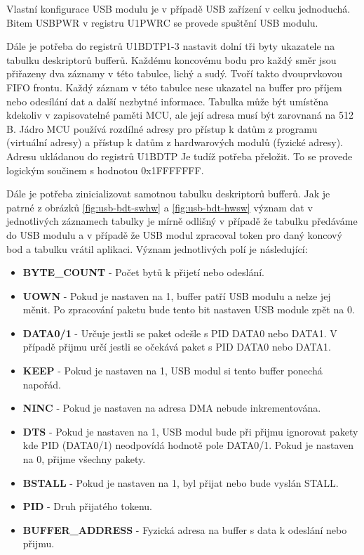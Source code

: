 Vlastní konfigurace USB modulu je v případě USB zařízení v celku jednoduchá. Bitem USBPWR v registru U1PWRC se provede spuštění USB modulu. 

Dále je potřeba do registrů U1BDTP1-3 nastavit dolní tři byty ukazatele na tabulku deskriptorů bufferů. Každému koncovému bodu pro každý směr jsou přiřazeny dva záznamy v této tabulce, lichý a sudý. Tvoří takto dvouprvkovou FIFO frontu.  Každý záznam v této tabulce nese ukazatel na buffer pro příjem nebo odesílání dat a další nezbytné informace. Tabulka může být umístěna kdekoliv v zapisovatelné paměti MCU, ale její adresa musí být zarovnaná na 512 B. Jádro MCU používá rozdílné adresy pro přístup k datům z programu (virtuální adresy) a přístup k datům z hardwarových modulů (fyzické adresy). Adresu ukládanou do registrů U1BDTP Je tudíž potřeba přeložit. To se provede logickým součinem s hodnotou 0x1FFFFFFF.



Dále je potřeba zinicializovat samotnou tabulku deskriptorů bufferů. Jak je patrné z obrázků \ref{fig:usb-bdt-swhw} a \ref{fig:usb-bdt-hwsw} význam dat v jednotlivých záznamech tabulky je mírně odlišný v případě že tabulku předáváme do USB modulu a v případě že USB modul zpracoval token pro daný koncový bod a tabulku vrátil aplikaci. Význam jednotlivých polí je následující:
\begin{itemize}
\item \textbf{BYTE\_COUNT} - Počet bytů k přijetí nebo odeslání.
\item \textbf{UOWN} - Pokud je nastaven na 1, buffer patří USB modulu a nelze jej měnit. Po zpracování paketu bude tento bit nastaven USB module zpět na 0.
\item \textbf{DATA0/1} - Určuje jestli se paket odešle s PID DATA0 nebo DATA1. V případě přijmu určí jestli se očekává paket s PID DATA0 nebo DATA1.
\item \textbf{KEEP} - Pokud je nastaven na 1, USB modul si tento buffer ponechá napořád.
\item \textbf{NINC} - Pokud je nastaven na adresa DMA nebude inkrementována.
\item \textbf{DTS} - Pokud je nastaven na 1, USB modul bude při přijmu ignorovat pakety kde PID (DATA0/1) neodpovídá hodnotě pole DATA0/1. Pokud je nastaven na 0, přijme všechny pakety.
\item \textbf{BSTALL} - Pokud je nastaven na 1, byl přijat nebo bude vyslán STALL. 
\item \textbf{PID} - Druh přijatého tokenu.
\item \textbf{BUFFER\_ADDRESS} - Fyzická adresa na buffer s data k odeslání nebo přijmu.
\end{itemize}

